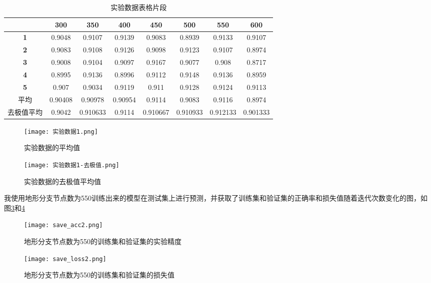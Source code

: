 \documentclass[lang=cn,11pt,a4paper,cite=authoryear]{elegantpaper}
\begin{document}
\begin{table}[htbp]
  \centering
  \caption{实验数据表格片段}
    \begin{tabular}{|c|c|c|c|c|c|c|c|}
    \toprule
          & \textbf{300} & \textbf{350} & \textbf{400} & \textbf{450} & \textbf{500} & \textbf{550} & \textbf{600} \\
    \midrule
    \textbf{1} & 0.9048 & 0.9107 & 0.9139 & 0.9083 & 0.8939 & 0.9133 & 0.9107 \\
    \midrule
    \textbf{2} & 0.9083 & 0.9108 & 0.9126 & 0.9098 & 0.9123 & 0.9107 & 0.8974 \\
    \midrule
    \textbf{3} & 0.9008 & 0.9104 & 0.9097 & 0.9167 & 0.9077 & 0.908 & 0.8717 \\
    \midrule
    \textbf{4} & 0.8995 & 0.9136 & 0.8996 & 0.9112 & 0.9148 & 0.9136 & 0.8959 \\
    \midrule
    \textbf{5} & 0.907 & 0.9034 & 0.9119 & 0.911 & 0.9128 & 0.9124 & 0.9113 \\
    \midrule
    平均    & 0.90408 & \cellcolor[rgb]{ 1,  .6,  .8}0.90978 & 0.90954 & \cellcolor[rgb]{ 1,  0,  0}0.9114 & 0.9083 & \cellcolor[rgb]{ .753,  0,  0}0.9116 & 0.8974 \\
    \midrule
    去极值平均 & 0.9042 & 0.910633 & \cellcolor[rgb]{ 1,  0,  0}0.9114 & 0.910667 & \cellcolor[rgb]{ 1,  .6,  .8}0.910933 & \cellcolor[rgb]{ .753,  0,  0}0.912133 & 0.901333 \\
    \bottomrule
    \end{tabular}%
  \label{tab:addlabel}%
\end{table}%

\begin{figure}[!htb]
  \centering
  \texttt{[image: 实验数据1.png]}
  \caption{实验数据的平均值}
  \label{fig:shuju1}
\end{figure}

\begin{figure}[!htb]
  \centering
  \texttt{[image: 实验数据1-去极值.png]}
  \caption{实验数据的去极值平均值}
  \label{fig:shuju1qujizhi}
\end{figure}

我使用地形分支节点数为550训练出来的模型在测试集上进行预测，并获取了训练集和验证集的正确率和损失值随着迭代次数变化的图，如图\ref{fig:train-acc1}和\ref{fig:train-loss1}
\begin{figure}[!htb]
  \centering
  \texttt{[image: save\_acc2.png]}
  \caption{地形分支节点数为550的训练集和验证集的实验精度}
  \label{fig:train-acc1}
\end{figure}
\begin{figure}[!htb]
  \centering
  \texttt{[image: save\_loss2.png]}
  \caption{地形分支节点数为550的训练集和验证集的损失值}
  \label{fig:train-loss1}
\end{figure}
\end{document}
